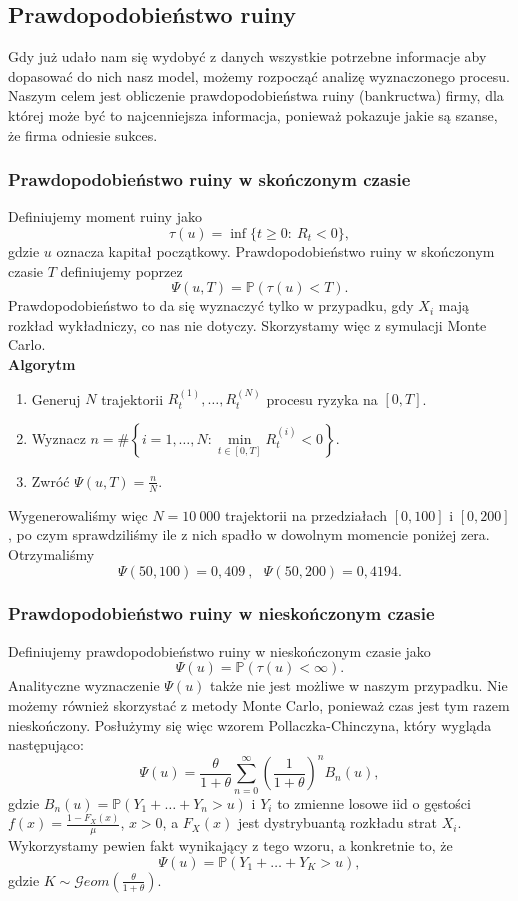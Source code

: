 \documentclass[12pt]{mwart}
\begin{document}
	
	
	\subsection{Prawdopodobieństwo ruiny}
	\noindent Gdy już udało nam się wydobyć z danych wszystkie potrzebne informacje aby dopasować do nich nasz model, możemy rozpocząć analizę wyznaczonego procesu. Naszym celem jest obliczenie prawdopodobieństwa ruiny (bankructwa) firmy, dla której może być to najcenniejsza informacja, ponieważ pokazuje jakie są szanse, że firma odniesie sukces.
	
	\subsubsection{Prawdopodobieństwo ruiny w skończonym czasie}
	\noindent Definiujemy moment ruiny jako
	$$ \tau(u) = \inf\{t \geq 0: \ R_t < 0\}, $$
	gdzie $u$ oznacza kapitał początkowy. Prawdopodobieństwo ruiny w skończonym czasie $T$ definiujemy poprzez
	$$ \Psi(u, T) = \mathbb{P}(\tau(u) < T). $$
	Prawdopodobieństwo to da się wyznaczyć tylko w przypadku, gdy $X_i$ mają rozkład wykładniczy, co nas nie dotyczy. Skorzystamy więc z symulacji Monte Carlo.\\
	
	\noindent \textbf{Algorytm}
	\begin{enumerate}[leftmargin=10mm]
		\item Generuj $N$ trajektorii $R_t^{(1)}, \dots, R_t^{(N)}$ procesu ryzyka na $[0, T]$.
		\item Wyznacz $ n = \#\left\{ i = 1,\dots,N: \min\limits_{t \in [0, T]} R_t^{(i)} < 0 \right\} $.
		\item Zwróć $\Psi(u, T) = \frac{n}{N}$.
	\end{enumerate}
	Wygenerowaliśmy więc $N = 10\ 000$ trajektorii na przedziałach $[0, 100]$ i $[0, 200]$, po czym sprawdziliśmy ile z nich spadło w dowolnym momencie poniżej zera. Otrzymaliśmy
	$$ \Psi(50, 100) = 0,409 \ , \ \ \ \Psi(50, 200) = 0,4194 .$$
	
	\subsubsection{Prawdopodobieństwo ruiny w nieskończonym czasie}
	\noindent Definiujemy prawdopodobieństwo ruiny w nieskończonym czasie jako
	$$ \Psi(u) = \mathbb{P}(\tau(u) < \infty). $$
	Analityczne wyznaczenie $\Psi(u)$ także nie jest możliwe w naszym przypadku. Nie możemy również skorzystać z metody Monte Carlo, ponieważ czas jest tym razem nieskończony. Posłużymy się więc wzorem Pollaczka-Chinczyna, który wygląda następująco:
	$$ \Psi(u) = \frac{\theta}{1 + \theta} \sum_{n=0}^{\infty} \left( \frac{1}{1 + \theta} \right)^n B_n(u), $$
	gdzie $B_n(u) = \mathbb{P}(Y_1 + \dots + Y_n > u)$ i $Y_i$ to zmienne losowe iid o gęstości \mbox{$f(x) = \frac{1 - F_X(x)}{\mu}$}, $x > 0$, a $F_X(x)$ jest dystrybuantą rozkładu strat $X_i$. Wykorzystamy pewien fakt wynikający z tego wzoru, a konkretnie to, że
	$$ \Psi(u) = \mathbb{P}(Y_1 + \dots + Y_K > u), $$
	gdzie $K \sim \mathcal{G}eom \left( \frac{\theta}{1+\theta} \right)$.\\
	
\end{document}
